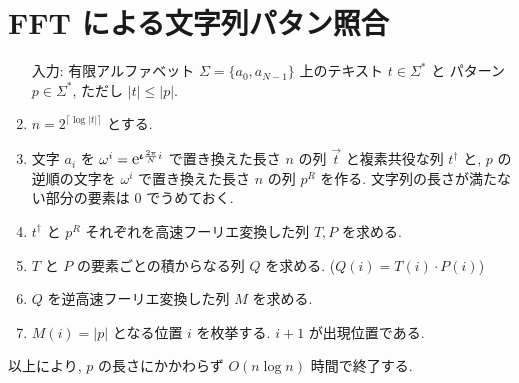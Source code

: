\documentclass[11pt]{jarticle}
\newcommand{\napier}{%
\mathnormal{\mbox{\large{$\mathrm{e}$}}}    %
}
\begin{document}
\section{FFT による文字列パタン照合}

\begin{enumerate}
\item[入力:]有限アルファベット $\Sigma = \{a_0, a_{N-1}\}$ 上のテキスト $t \in \Sigma^*$ と パターン $p \in \Sigma^*$, ただし $|t| \leq |p|$. 
\item $n = 2^{\lceil{\log {|t|}}\rceil}$ とする. 
\item 文字 $a_i$ を $\omega^i = \napier^{\boldsymbol\iota\frac{2\pi}{N}i}$ で置き換えた長さ $n$ の列 $\vec{t}$ と複素共役な列 $t^\dagger$ と, $p$ の逆順の文字を $\omega^i$ で置き換えた長さ $n$ の列 $p^R$ を作る. 
文字列の長さが満たない部分の要素は $0$ でうめておく. 
\item $t^\dagger$ と $p^R$ それぞれを高速フーリエ変換した列 $T, P$ を求める.
\item $T$ と $P$ の要素ごとの積からなる列 $Q$ を求める. ($Q(i) = T(i)\cdot P(i)$)
\item $Q$ を逆高速フーリエ変換した列 $M$ を求める. 
\item $M(i) = |p|$ となる位置 $i$ を枚挙する. $i+1$ が出現位置である. 
\end{enumerate}
以上により, $p$ の長さにかかわらず $O(n \log n)$ 時間で終了する. 
\end{document}
